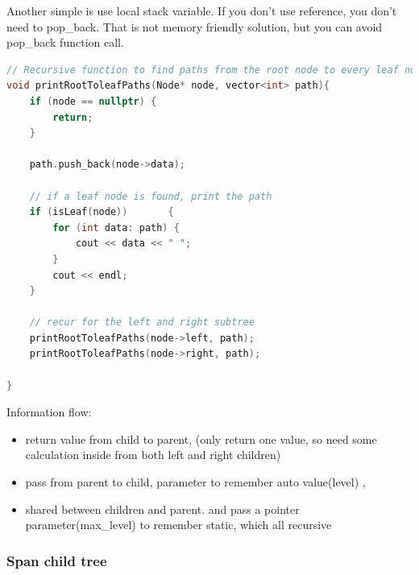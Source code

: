 \documentclass[a4paper,11pt,twoside]{book}
\begin{document}
	\par Another simple is use local stack variable. If you don't use reference, you don't need to pop\_back. That is not memory friendly solution, but you can avoid pop\_back function call. 
\begin{lstlisting}[frame=single, language=c++]
// Recursive function to find paths from the root node to every leaf node
void printRootToleafPaths(Node* node, vector<int> path){
	if (node == nullptr) {
		return;
	}
	
	path.push_back(node->data);
	
	// if a leaf node is found, print the path
	if (isLeaf(node))		{
		for (int data: path) {
			cout << data << " ";
		}
		cout << endl;
	}
	
	// recur for the left and right subtree
	printRootToleafPaths(node->left, path);
	printRootToleafPaths(node->right, path);
	
}		
\end{lstlisting}


	\par Information flow:
\begin{itemize}
	\item  return value from child to parent, (only return one value, so need some calculation inside from both left and right children)
	
	\item pass from parent to child, parameter to remember auto value(level) , 
	
	\item shared between children and parent. and pass a pointer parameter(max\_level) to remember static, which all recursive 
\end{itemize}
	








\subsubsection{Span child tree}
\end{document}
